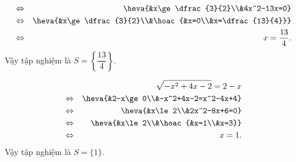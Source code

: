 \begin{bt}
{\begin{listEX}[2]
\begin{eqnarray*}
				&\Leftrightarrow& \heva{&x\ge \dfrac{3}{2}\\&4x^2-13x=0}\\
				&\Leftrightarrow& \heva{&x\ge \dfrac{3}{2}\\&\hoac{&x=0\\&x=\dfrac{13}{4}}}\\
				&\Leftrightarrow& x=\dfrac{13}{4}.
			\end{eqnarray*}	
			Vậy tập nghiệm là $S=\left\{\dfrac{13}{4}\right\}$.	
			\item
			\begin{eqnarray*}
				&&\sqrt{-x^2+4x-2}=2-x\\
				&\Leftrightarrow& \heva{&2-x\ge 0\\&-x^2+4x-2=x^2-4x+4}\\
				&\Leftrightarrow& \heva{&x\le 2\\&2x^2-8x+6=0}\\
				&\Leftrightarrow& \heva{&x\le 2\\&\hoac{&x=1\\&x=3}}\\
				&\Leftrightarrow& x=1.
			\end{eqnarray*}	
			Vậy tập nghiệm là $S=\{1\}$.	
		\end{listEX}
	} 
\end{bt}


